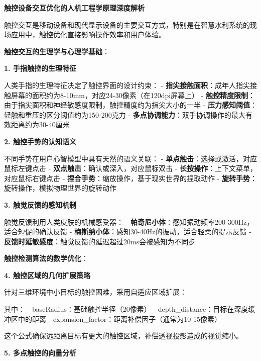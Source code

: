 
\textbf{触控设备交互优化的人机工程学原理深度解析}

触控交互是移动设备和现代显示设备的主要交互方式，特别是在智慧水利系统的现场应用中，触控优化直接影响操作效率和用户体验。

\textbf{触控交互的生理学与心理学基础}：

\textbf{1. 手指触控的生理特征}

人类手指的生理特征决定了触控界面的设计约束： - \textbf{指尖接触面积}：成年人指尖接触屏幕的面积约为8-10mm，对应24-30像素（在120dpi屏幕上） - \textbf{触控精度限制}：由于指尖面积和神经敏感度限制，触控精度约为指尖大小的一半 - \textbf{压力感知阈值}：轻触和重压的区分阈值约为150-200克力 - \textbf{多点协调能力}：双手协调操作的最大有效距离约为30-40厘米

\textbf{2. 触控手势的认知语义}

不同手势在用户心智模型中具有天然的语义关联： - \textbf{单点触击}：选择或激活，对应鼠标左键点击 - \textbf{双点触击}：确认或深入，对应鼠标双击 - \textbf{长按操作}：上下文菜单，对应鼠标右键点击 - \textbf{捏合手势}：缩放操作，基于现实世界的捏取动作 - \textbf{旋转手势}：旋转操作，模拟物理世界的旋转动作

\textbf{3. 触觉反馈的感知机制}

触觉反馈利用人类皮肤的机械感受器： - \textbf{帕奇尼小体}：感知振动频率200-300Hz，适合短促的确认反馈 - \textbf{梅斯纳小体}：感知30-40Hz的振动，适合轻柔的提示反馈 - \textbf{反馈时延敏感度}：触觉反馈的延迟超过20ms会被感知为不同步

\textbf{触控检测算法的数学优化}：

\textbf{4. 触控区域的几何扩展策略}

针对三维环境中小目标的触控困难，采用自适应区域扩展：

\begin{Shaded}
\begin{Highlighting}[]
\OperatorTok{=}\OperatorTok{+}\OperatorTok{/}\OperatorTok{*}
\end{Highlighting}
\end{Shaded}

其中： - baseRadius：基础触控半径（20像素） - depth\_distance：目标在深度缓冲区中的距离 - expansion\_factor：距离补偿因子（通常为10-15像素）

这个公式确保远距离目标有更大的触控区域，补偿透视投影造成的视觉缩小。

\textbf{5. 多点触控的向量分析}

